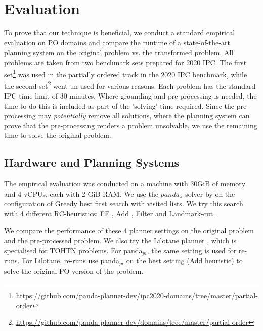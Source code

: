 \chapter{Evaluation}\label{chap:evaluation}

To prove that our technique is beneficial, we conduct a standard empirical evaluation on PO domains and compare the runtime of a state-of-the-art planning system on the original problem vs. the transformed problem. All problems are taken from two benchmark sets prepared for 2020 IPC. The first set\footnote{\url{https://github.com/panda-planner-dev/ipc2020-domains/tree/master/partial-order}} was used in the partially ordered track in the 2020 IPC benchmark, while the second set\footnote{\url{https://github.com/panda-planner-dev/domains/tree/master/partial-order}} went un-used for various reasons. Each problem has the standard IPC time limit of 30 minutes. Where grounding and pre-processing is needed, the time to do this is included as part of the 'solving' time required. Since the pre-processing may \emph{potentially} remove all solutions, where the planning system can prove that the pre-processing renders a problem unsolvable, we use the remaining time to solve the original problem.

\section{Hardware and Planning Systems}
The empirical evaluation was conducted on a machine with 30GiB of memory and 4 vCPUs, each with 2 GiB RAM.  We use the $panda_{\pi}$ solver by \citep{useClassicalHuristicICAPS18,useClassicalHeuristicIJCAI19,progressionsearchJAIR20} on the configuration of Greedy best first search with visited lists. We try this search with 4 different RC-heuristics: FF \cite{FF}, Add \cite{Add}, Filter \cite{useClassicalHuristicICAPS18} and Landmark-cut \cite{LM-Cut}.

We compare the performance of these 4 planner settings on the original problem and the pre-processed problem.
We also try the Lilotane planner \cite{Lilotane}, which is specialised for TOHTN problems. For panda$_{pi}$, the same setting is used for re-runs. For Lilotane, re-runs use panda$_{pi}$ on the best setting (Add heuristic) to solve the original PO version of the problem.



